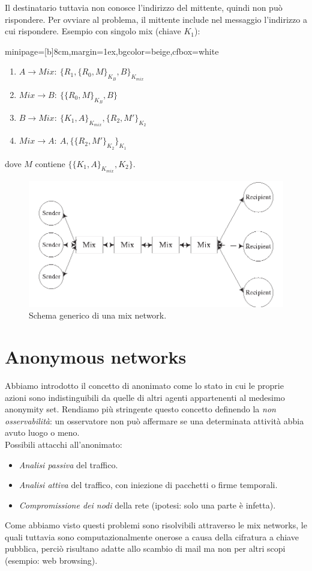 \documentclass[a4paper, 11pt, twoside, openright, fleqn]{report}
\newcommand{\fromto}[2]{#1\rightarrow #2\!:\ }
\newenvironment{colbox}[2]%
{%
	\par\noindent\hspace{10pt}
	\begin{adjustbox}{minipage=[b]{#2},margin=1ex,bgcolor=#1,cfbox=white}
}{%
	\end{adjustbox}\newline%
}
\begin{document}
Il destinatario tuttavia non conosce l'indirizzo del mittente, quindi non può rispondere. Per ovviare al problema, il mittente include nel messaggio l'indirizzo a cui rispondere. Esempio con singolo mix (chiave $K_1$):
\begin{colbox}{beige}{8cm}
	\begin{enumerate}
		\item $\fromto{A}{Mix}\{ R_1, \{R_0, M\}_{K_B}, B\}_{K_{mix}}$
		\item $\fromto{Mix}{B}\{\{R_0, M\}_{K_B}, B\}$
		\item $\fromto{B}{Mix}\{K_1, A\}_{K_{mix}}, \{R_2, M'\}_{K_2}$
		\item $\fromto{Mix}{A}A,\{\{R_2, M'\}_{K_2}\}_{K_1}$
	\end{enumerate}
\end{colbox}
dove $M$ contiene $\{\{K_1, A\}_{K_{mix}}, K_2\}$.

\begin{figure}[htp]
	\centering
	\includegraphics[width=\textwidth]{images/MixNetwork}
	\caption{Schema generico di una mix network.}
\end{figure}

\section{Anonymous networks}
Abbiamo introdotto il concetto di anonimato come lo stato in cui le proprie azioni sono indistinguibili da quelle di altri agenti appartenenti al medesimo anonymity set. Rendiamo più stringente questo concetto definendo la \emph{non osservabilità}: un osservatore non può affermare se una determinata attività abbia avuto luogo o meno.\\
Possibili attacchi all'anonimato:
\begin{itemize}
	\item \emph{Analisi passiva} del traffico.
	\item \emph{Analisi attiva} del traffico, con iniezione di pacchetti o firme temporali.
	\item \emph{Compromissione dei nodi} della rete (ipotesi: solo una parte è infetta).
\end{itemize}
Come abbiamo visto questi problemi sono risolvibili attraverso le mix networks, le quali tuttavia sono computazionalmente onerose a causa della cifratura a chiave pubblica, perciò risultano adatte allo scambio di mail ma non per altri scopi (esempio: web browsing).
\end{document}
